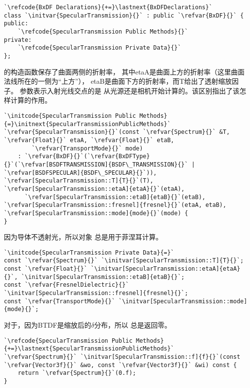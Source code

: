 \begin{lstlisting}
`\refcode{BxDF Declarations}{+=}\lastnext{BxDFDeclarations}`
class `\initvar{SpecularTransmission}{}` : public `\refvar{BxDF}{}` {
public:
    `\refcode{SpecularTransmission Public Methods}{}`
private:
    `\refcode{SpecularTransmission Private Data}{}`
};
\end{lstlisting}

的构造函数保存了曲面两侧的折射率，
其中{\ttfamily etaA}是曲面上方的折射率（这里曲面法线所在的一侧为“上方”），
{\ttfamily etaB}是曲面下方的折射率，而{\ttfamily T}给出了透射缩放因子。
参数表示入射光线交点的是
从光源还是相机开始计算的。该区别指出了该怎样计算的作用。
\begin{lstlisting}
`\initcode{SpecularTransmission Public Methods}{=}\initnext{SpecularTransmissionPublicMethods}`
`\refvar{SpecularTransmission}{}`(const `\refvar{Spectrum}{}` &T, `\refvar{Float}{}` etaA, `\refvar{Float}{}` etaB,
        `\refvar{TransportMode}{}` mode) 
    : `\refvar{BxDF}{}`(`\refvar{BxDFType}{}`(`\refvar[BSDFTRANSMISSION]{BSDF\_TRANSMISSION}{}` | `\refvar[BSDFSPECULAR]{BSDF\_SPECULAR}{}`)), `\refvar[SpecularTransmission::T]{T}{}`(T), `\refvar[SpecularTransmission::etaA]{etaA}{}`(etaA),
      `\refvar[SpecularTransmission::etaB]{etaB}{}`(etaB), `\refvar[SpecularTransmission::fresnel]{fresnel}{}`(etaA, etaB), `\refvar[SpecularTransmission::mode]{mode}{}`(mode) {
}
\end{lstlisting}
因为导体不透射光，所以对象
总是用于菲涅耳计算。

\begin{lstlisting}
`\initcode{SpecularTransmission Private Data}{=}`
const `\refvar{Spectrum}{}` `\initvar[SpecularTransmission::T]{T}{}`;
const `\refvar{Float}{}` `\initvar[SpecularTransmission::etaA]{etaA}{}`, `\initvar[SpecularTransmission::etaB]{etaB}{}`;
const `\refvar{FresnelDielectric}{}` `\initvar[SpecularTransmission::fresnel]{fresnel}{}`;
const `\refvar{TransportMode}{}` `\initvar[SpecularTransmission::mode]{mode}{}`;
\end{lstlisting}

对于，因为BTDF是缩放后的$\delta$分布，所以\linebreak
{}总是返回零。
\begin{lstlisting}
`\refcode{SpecularTransmission Public Methods}{+=}\lastnext{SpecularTransmissionPublicMethods}`
`\refvar{Spectrum}{}` `\initvar[SpecularTransmission::f]{f}{}`(const `\refvar{Vector3f}{}` &wo, const `\refvar{Vector3f}{}` &wi) const { 
    return `\refvar{Spectrum}{}`(0.f); 
}
\end{lstlisting}

